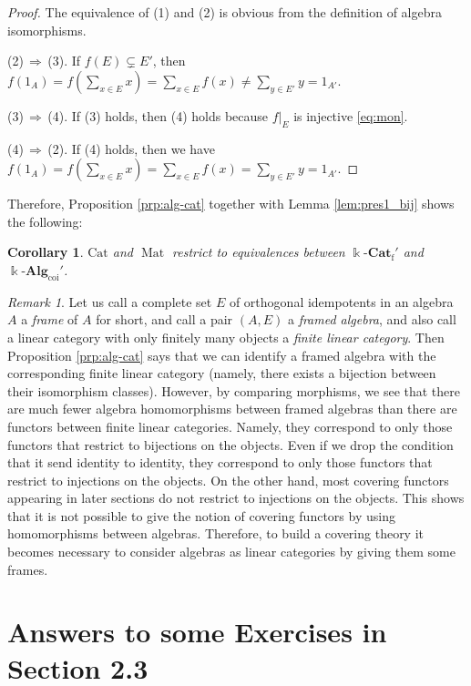 \documentclass{surv-l}
\numberwithin{equation}{chapter}
\numberwithin{figure}{chapter}
\theoremstyle{plain}
\newtheorem{cor}[thm]{Corollary}
\theoremstyle{definition}
\theoremstyle{remark}
\newtheorem{rmk}[thm]{Remark}
\newcommand{\kCat}{\Bbbk\text{-}\mathbf{Cat}}
\DeclareMathOperator{\Mat}{Mat}
\begin{document}
\begin{proof}
The equivalence of (1) and (2) is obvious from the definition of algebra isomorphisms.

(2)\,$\Rightarrow$\,(3). If $f(E) \subsetneq E'$, then
$f(1_A) = f(\sum_{x \in E}x) = \sum_{x \in E}f(x) \ne \sum_{y\in E'}y = 1_{A'}$.

(3)\,$\Rightarrow$\,(4). If (3) holds, then (4) holds because
$f|_E$ is injective \eqref{eq:mon}.

(4)\,$\Rightarrow$\,(2).
If (4) holds, then
we have $f(1_A) = f(\sum_{x\in E}x) = \sum_{x\in E}f(x) = \sum_{y\in E'} y = 1_{A'}$.
\end{proof}

Therefore, Proposition \ref{prp:alg-cat} together with Lemma \ref{lem:pres1_bij} shows the following:

\begin{cor}
$\mathrm{Cat}$ and $\Mat$ restrict to equivalences between
$\kCat_{\mathrm{f}}'$ and $\Bbbk\text{-}\mathbf{Alg}_{\mathrm{coi}}'$.
\end{cor}

\begin{rmk}\label{rmk:framed-alg-fin-lin-cat}
Let us call a complete set $E$ of orthogonal idempotents in an algebra $A$
a \emph{frame} of $A$ for short, and call a pair $(A, E)$
a \emph{framed algebra}, and also call a linear category with only finitely many objects
a \emph{finite linear category}.
Then Proposition \ref{prp:alg-cat} says that we can identify a framed algebra with the
corresponding finite linear category (namely, there exists a bijection between
their isomorphism classes).
However, by comparing morphisms,
we see that there are much fewer algebra homomorphisms between framed algebras than
there are
functors between finite linear categories.
Namely, they correspond to only those functors that restrict to bijections on the objects.
Even if we drop the condition that it send identity to identity, they correspond
to only those
functors that restrict to injections on the objects.
On the other hand, most covering functors appearing in later sections
do not restrict to injections on the objects.
This shows that it is not possible to give the notion of covering functors by using homomorphisms between algebras.
Therefore, to build a covering theory it becomes necessary to consider algebras as linear categories
by giving them some frames.
\end{rmk}

\section{Answers to some Exercises in Section 2.3}\label{app:b.2}
\end{document}

